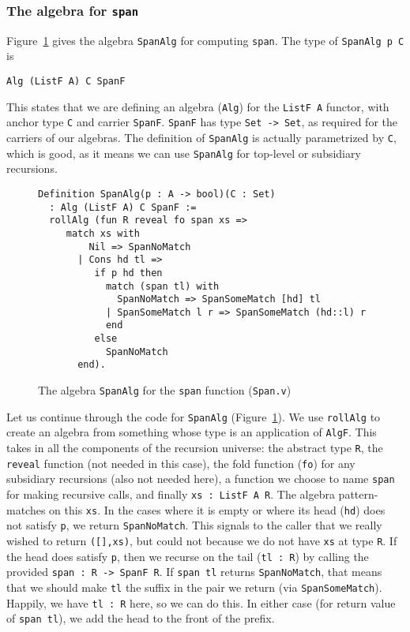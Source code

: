 \documentclass[a4paper,USenglish]{lipics-v2021}
\begin{document}
\subsubsection{The algebra for \texttt{span}}

Figure~\ref{fig:spanalg} gives the algebra \verb|SpanAlg| for computing
\verb|span|.  The type of \verb|SpanAlg p C| is
\begin{verbatim}
Alg (ListF A) C SpanF
\end{verbatim}
This states that we are defining an algebra (\verb|Alg|) for the
\verb|ListF A| functor, with anchor type \verb|C| and carrier
\verb|SpanF|.  \verb|SpanF| has type \verb|Set -> Set|, as required
for the carriers of our algebras. The definition of \verb|SpanAlg| is
actually parametrized by \verb|C|, which is good, as it means we can
use \verb|SpanAlg| for top-level or subsidiary recursions.

\begin{figure}
\begin{verbatim}
Definition SpanAlg(p : A -> bool)(C : Set)
  : Alg (ListF A) C SpanF :=
  rollAlg (fun R reveal fo span xs => 
     match xs with
         Nil => SpanNoMatch 
       | Cons hd tl =>
          if p hd then
            match (span tl) with
              SpanNoMatch => SpanSomeMatch [hd] tl
            | SpanSomeMatch l r => SpanSomeMatch (hd::l) r
            end
          else
            SpanNoMatch 
       end).
\end{verbatim}
\caption{The algebra \texttt{SpanAlg} for the \texttt{span} function (\texttt{Span.v})}
\label{fig:spanalg}
\end{figure}

Let us continue through the code for \verb|SpanAlg|
(Figure~\ref{fig:spanalg}).  We use \verb|rollAlg| to create an algebra
from something whose type is an application of \verb|AlgF|.  This
takes in all the components of the recursion universe: the abstract
type \verb|R|, the \verb|reveal| function (not needed in this case),
the fold function (\verb|fo|) for any subsidiary recursions (also not
needed here), a function we choose to name \verb|span| for making
recursive calls, and finally \verb|xs : ListF A R|.  The algebra
pattern-matches on this \verb|xs|.  In the cases where it is empty or
where its head (\verb|hd|) does not satisfy \verb|p|, we return
\verb|SpanNoMatch|.  This signals to the caller that we really wished
to return \verb|([],xs)|, but could not because we do not have
\verb|xs| at type \verb|R|.  If the head does satisfy \verb|p|, then
we recurse on the tail (\verb|tl : R|) by calling the provided \verb|span : R -> SpanF R|.
If \verb|span tl|
returns \verb|SpanNoMatch|, that means that we should make \verb|tl|
the suffix in the pair we return (via \verb|SpanSomeMatch|).  Happily,
we have \verb|tl : R| here, so we can do this.  In either case (for
return value of \verb|span tl|), we add the head to the front of the
prefix.
\end{document}
